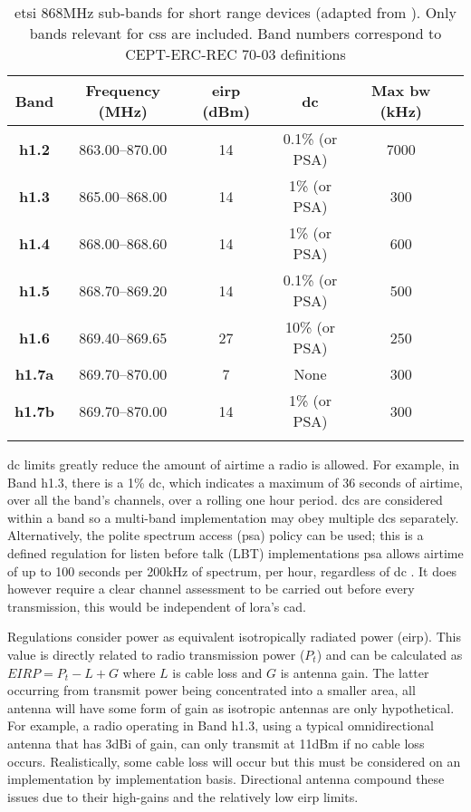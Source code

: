 \begin{table}[H]
\centering\small
\caption[\ac{etsi} 868MHz sub-band breakdown]{\ac{etsi} 868MHz sub-bands for short range devices (adapted from \cite{3YP:ETSI_HARMONISED_REG}). Only bands relevant for \ac{css} are included. Band numbers correspond to CEPT-ERC-REC 70-03 definitions \cite{3YP:CEPT_ERC_REC}}
\label{tab:ETSIBands}
\renewcommand*{\arraystretch}{1.1}
\begin{tabular}{c|ccccc}
    \toprule
    \textbf{Band} & \textbf{Frequency} (MHz) & \textbf{\ac{eirp}} (dBm)  & \textbf{\ac{dc}} & \textbf{Max \ac{bw}} (kHz) \\
    \midrule\addlinespace
    \textbf{h1.2} & 863.00--870.00 & 14 & 0.1\% (or PSA) & 7000 \\
    \textbf{h1.3} & 865.00--868.00 & 14 & 1\% (or PSA) & 300 \\
    \textbf{h1.4} & 868.00--868.60 & 14 & 1\% (or PSA) & 600 \\
    \textbf{h1.5} & 868.70--869.20 & 14 & 0.1\% (or PSA) & 500 \\
    \textbf{h1.6} & 869.40--869.65 & 27 & 10\% (or PSA) & 250 \\
    \textbf{h1.7a} & 869.70--870.00 & 7 & None & 300 \\
    \textbf{h1.7b} & 869.70--870.00 & 14 & 1\% (or PSA) & 300 \\   
    \addlinespace\bottomrule
\end{tabular}
\end{table}

\ac{dc} limits greatly reduce the amount of airtime a radio is allowed. For example, in Band h1.3, there is a 1\% \ac{dc}, which indicates a maximum of 36 seconds of airtime, over all the band's channels, over a rolling one hour period. \ac{dc}s are considered within a band so a multi-band implementation may obey multiple \ac{dc}s separately. Alternatively, the polite spectrum access (\ac{psa}) policy can be used; this is a defined regulation for listen before talk (LBT) implementations \ac{psa} allows airtime of up to 100 seconds per 200kHz of spectrum, per hour, regardless of \ac{dc} \cite{3YP:ETSI_PSA}. It does however require a clear channel assessment to be carried out before every transmission, this would be independent of \ac{lora}'s \ac{cad}.

Regulations consider power as equivalent isotropically radiated power (\ac{eirp}). This value is directly related to radio transmission power ($P_t$) and can be calculated as $EIRP = P_t - L + G$ where $L$ is cable loss and $G$ is antenna gain. The latter occurring from transmit power being concentrated into a smaller area, all antenna will have some form of gain as isotropic antennas are only hypothetical. For example, a radio operating in Band h1.3, using a typical omnidirectional antenna that has 3dBi of gain, can only transmit at 11dBm if no cable loss occurs. Realistically, some cable loss will occur but this must be considered on an implementation by implementation basis. Directional antenna compound these issues due to their high-gains and the relatively low \ac{eirp} limits.

